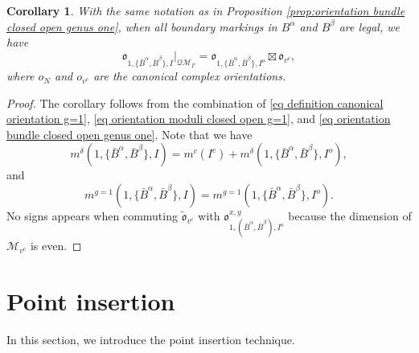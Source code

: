 \documentclass[11pt,a4paper]{article}
\newtheorem{cor}[dummy]{Corollary}
\theoremstyle{definition}
\theoremstyle{remark}
\newcommand{\oQMb}{{\overline{\mathcal{QM}}}}
\numberwithin{equation}{section}
\begin{document}
\begin{cor}\label{cor:orientation closed open g=1}
     With the same notation as in Proposition \ref{prop:orientation bundle closed open genus one}, when all boundary markings in $B^\alpha$ and $B^\beta$ are legal, we have 
     \begin{equation}\label{eq orientation relative closed open g=1}
        {\mathfrak{o}}_{1,\{\bar{B}^\alpha,\bar{B}^\beta\},I}|_{\oQMb_\Gamma} = {\mathfrak{o}}_{1,\{\bar{B}^\alpha,\bar{B}^\beta\},I^o}\boxtimes {\mathfrak{o}}_{v^c},
        \end{equation}
        where $o_N$ and ${{o}}_{v^c}$ are the canonical complex orientations.
\end{cor}
\begin{proof}
    The corollary follows from the combination of \eqref{eq definition canonical orientation g=1}, \eqref{eq orientation moduli closed open g=1}, and \eqref{eq orientation bundle closed open genus one}. Note that we have
    $$
    m^\delta(1,\{\bar B^\alpha, \bar B^\beta\}, I)=m^c(I^c)+ m^\delta(1,\{\bar B^\alpha, \bar B^\beta \}, I^o),
    $$
    and
    $$
    m^{g=1}(1,\{\bar B^\alpha, \bar B^\beta\}, I)=m^{g=1}(1,\{\bar B^\alpha, \bar B^\beta \}, I^o).
    $$
    No signs appears when commuting $ \tilde{\mathfrak{o}}_{v^c}$ with ${\mathfrak{o}}^{x,y}_{1,(\bar{B}^\alpha,\bar{B}^\beta),I^o}$ because the dimension of $\mathcal M_{v^c}$ is even.
\end{proof}

  


\section{Point insertion}\label{sec:point_ins}

In this section, we introduce the point insertion technique.
\end{document}
